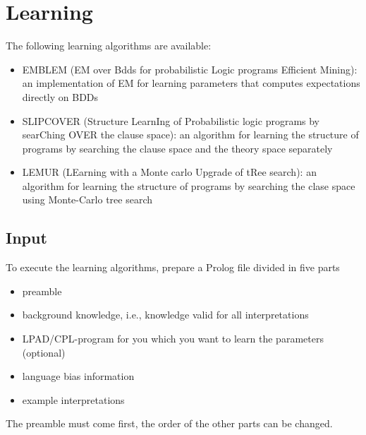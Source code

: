 \documentclass[letterpaper,10pt,english]{sphinxmanual}
\begin{document}
\chapter{Learning}
\label{\detokenize{index:learning}}
The following learning algorithms are available:
\begin{itemize}
\item {} 
EMBLEM (EM over Bdds for probabilistic Logic programs Efficient Mining): an implementation of EM for learning parameters that computes expectations directly on BDDs 

\item {} 
SLIPCOVER (Structure LearnIng of Probabilistic logic programs by searChing OVER the clause space): an algorithm for learning the structure of programs by searching the clause space and the theory space separately 

\item {} 
LEMUR (LEarning with a Monte carlo Upgrade of tRee search): an algorithm for learning the structure of programs by searching the clase space using Monte-Carlo tree search 

\end{itemize}


\section{Input}
\label{\detokenize{index:input}}
To execute the learning algorithms, prepare a Prolog file divided in five parts
\begin{itemize}
\item {} 
preamble

\item {} 
background knowledge, i.e., knowledge valid for all interpretations

\item {} 
LPAD/CPL-program for you which you want to learn the parameters (optional)

\item {} 
language bias information

\item {} 
example interpretations

\end{itemize}

The preamble must come first, the order of the other parts can be changed.
\end{document}
